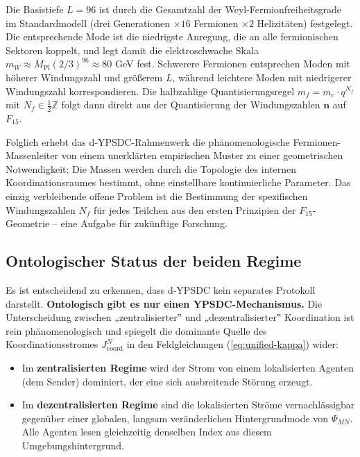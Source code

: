 \documentclass[12pt,a4paper]{article}
\begin{document}
	Die Basistiefe \(L=96\) ist durch die Gesamtzahl der Weyl-Fermionfreiheitsgrade im Standardmodell (drei Generationen \(\times 16\) Fermionen \(\times 2\) Helizitäten) festgelegt. Die entsprechende Mode ist die niedrigste Anregung, die an alle fermionischen Sektoren koppelt, und legt damit die elektroschwache Skala \(m_W \approx M_{\mathrm{Pl}} (2/3)^{96} \approx 80\) GeV fest. Schwerere Fermionen entsprechen Moden mit höherer Windungszahl und größerem \(L\), während leichtere Moden mit niedrigerer Windungszahl korrespondieren. Die halbzahlige Quantisierungsregel \(m_f = m_e \cdot q^{N_f}\) mit \(N_f \in \frac{1}{2}\mathbb{Z}\) folgt dann direkt aus der Quantisierung der Windungszahlen \(\mathbf{n}\) auf \(F_{15}\).
	
	Folglich erhebt das d‑YPSDC-Rahmenwerk die phänomenologische Fermionen-Massenleiter von einem unerklärten empirischen Muster zu einer geometrischen Notwendigkeit: Die Massen werden durch die Topologie des internen Koordinationsraumes bestimmt, ohne einstellbare kontinuierliche Parameter. Das einzig verbleibende offene Problem ist die Bestimmung der spezifischen Windungszahlen \(N_f\) für jedes Teilchen aus den ersten Prinzipien der \(F_{15}\)-Geometrie – eine Aufgabe für zukünftige Forschung.
	
	\subsection{Ontologischer Status der beiden Regime}
	\label{subsec:ontological-status}
	
	Es ist entscheidend zu erkennen, dass d‑YPSDC kein separates Protokoll darstellt.
	\textbf{Ontologisch gibt es nur einen YPSDC-Mechanismus.} Die Unterscheidung zwischen
	„zentralisierter‟ und „dezentralisierter‟ Koordination ist rein phänomenologisch und
	spiegelt die dominante Quelle des Koordinationsstromes
	\(J^{N}_{\mathrm{coord}}\) in den Feldgleichungen (\ref{eq:unified-kappa}) wider:
	
	\begin{itemize}[leftmargin=*]
		\item Im \textbf{zentralisierten Regime} wird der Strom von einem lokalisierten
		Agenten (dem Sender) dominiert, der eine sich ausbreitende Störung erzeugt.
		\item Im \textbf{dezentralisierten Regime} sind die lokalisierten Ströme
		vernachlässigbar gegenüber einer globalen, langsam veränderlichen Hintergrundmode von \(\Psi_{MN}\). Alle Agenten
		lesen gleichzeitig denselben Index aus diesem Umgebungshintergrund.
	\end{itemize}
	
\end{document}
